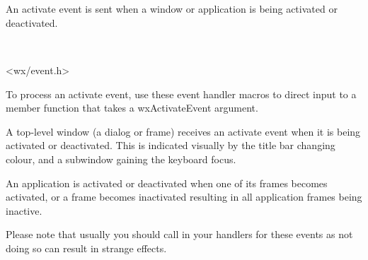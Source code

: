 \section{}\label{wxactivateevent}

An activate event is sent when a window or application is being activated
or deactivated.


\\


<wx/event.h>




To process an activate event, use these event handler macros to direct input to a member
function that takes a wxActivateEvent argument.

\twocolwidtha{7cm}
\begin{twocollist}\itemsep=0pt
\end{twocollist}%


A top-level window (a dialog or frame) receives an activate event when it is
being activated or deactivated. This is indicated visually by the title
bar changing colour, and a subwindow gaining the keyboard focus.

An application is activated or deactivated when one of its frames becomes activated,
or a frame becomes inactivated resulting in all application frames being inactive.

Please note that usually you should call  in
your handlers for these events as not doing so can result in strange effects.


